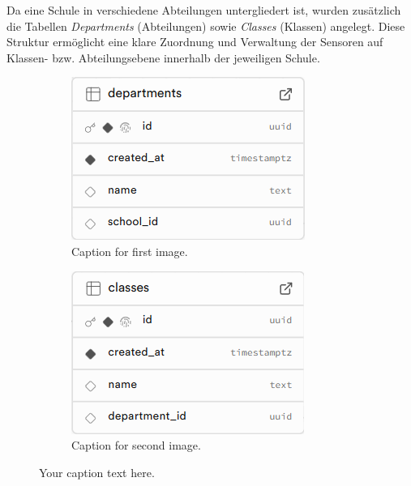 \begin{inhalt}
Da eine Schule in verschiedene Abteilungen untergliedert ist, wurden zusätzlich die Tabellen \textit{Departments} (Abteilungen) sowie \textit{Classes} (Klassen) angelegt. Diese Struktur ermöglicht eine klare Zuordnung und Verwaltung der Sensoren auf Klassen- bzw. Abteilungsebene innerhalb der jeweiligen Schule.

\begin{figure}[!htb]
  \centering
  \begin{subfigure}[b]{0.45\textwidth}
    \centering
    \includegraphics[width=\textwidth]{files/Thomas/pics/Datenbank_Design/departments.png}
    \caption{Caption for first image.}
    \label{fig:school1}
  \end{subfigure}
  \hfill
  \begin{subfigure}[b]{0.45\textwidth}
    \centering
    \includegraphics[width=\textwidth]{files/Thomas/pics/Datenbank_Design/classes.png}
    \caption{Caption for second image.}
    \label{fig:school2}
  \end{subfigure}
  \caption[Bildbezeichnung für Abbildungsverzeichnis]{Your caption text here.}
  \label{fig:gehaeuse_internet_bild}
\end{figure}


\end{inhalt}
